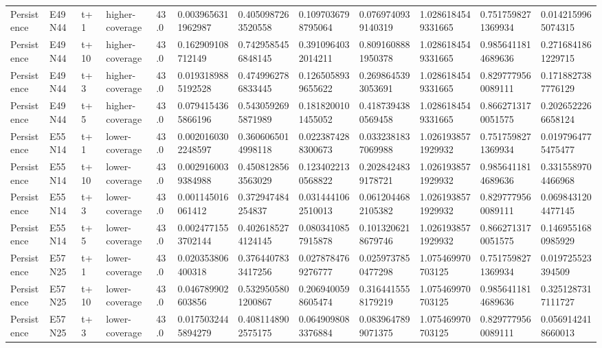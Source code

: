 \begin{landscape}
\begin{longtable}{llllllllllll}
Persistence & E49N44 & t+1 & higher-coverage & 43.0 & 0.0039656311962987 & 0.4050987263520558 & 0.1097036798795064 & 0.0769740939140319 & 1.0286184549331665 & 0.7517598271369934 & 0.0142159965074315 \\
Persistence & E49N44 & t+10 & higher-coverage & 43.0 & 0.162909108712149 & 0.7429585456848145 & 0.3910964032014211 & 0.8091608881950378 & 1.0286184549331665 & 0.9856411814689636 & 0.2716841861229715 \\
Persistence & E49N44 & t+3 & higher-coverage & 43.0 & 0.0193189885192528 & 0.4749962786833445 & 0.1265058939655622 & 0.2698645393053691 & 1.0286184549331665 & 0.8297779560089111 & 0.1718827387776129 \\
Persistence & E49N44 & t+5 & higher-coverage & 43.0 & 0.0794154365866196 & 0.5430592695871989 & 0.1818200101455052 & 0.4187394380569458 & 1.0286184549331665 & 0.8662713170051575 & 0.2026522266658124 \\
Persistence & E55N14 & t+1 & lower-coverage & 43.0 & 0.0020160302248597 & 0.3606065014998118 & 0.0223874288300673 & 0.0332381837069988 & 1.0261938571929932 & 0.7517598271369934 & 0.0197964775475477 \\
Persistence & E55N14 & t+10 & lower-coverage & 43.0 & 0.0029160039384988 & 0.4508128563563029 & 0.1234022130568822 & 0.2028424839178721 & 1.0261938571929932 & 0.9856411814689636 & 0.3315589704466968 \\
Persistence & E55N14 & t+3 & lower-coverage & 43.0 & 0.001145016061412 & 0.372947484254837 & 0.0314441062510013 & 0.0612044682105382 & 1.0261938571929932 & 0.8297779560089111 & 0.0698431204477145 \\
Persistence & E55N14 & t+5 & lower-coverage & 43.0 & 0.0024771553702144 & 0.4026185274124145 & 0.0803410857915878 & 0.1013206218679746 & 1.0261938571929932 & 0.8662713170051575 & 0.1469551680985929 \\
Persistence & E57N25 & t+1 & lower-coverage & 43.0 & 0.020353806400318 & 0.3764407833417256 & 0.0278784769276777 & 0.0259737850477298 & 1.075469970703125 & 0.7517598271369934 & 0.019725523394509 \\
Persistence & E57N25 & t+10 & lower-coverage & 43.0 & 0.046789902603856 & 0.5329505801200867 & 0.2069400598605474 & 0.3164415558179219 & 1.075469970703125 & 0.9856411814689636 & 0.3251287317111727 \\
Persistence & E57N25 & t+3 & lower-coverage & 43.0 & 0.0175032445894279 & 0.4081148902575175 & 0.0649098083376884 & 0.0839647899071375 & 1.075469970703125 & 0.8297779560089111 & 0.0569142418660013 \\

\end{longtable}
\end{landscape}
